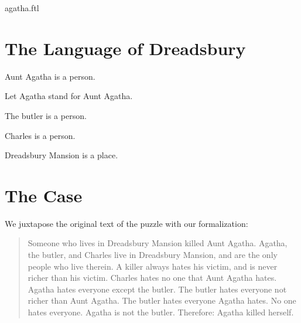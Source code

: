 \documentclass{article}
\begin{document}
\begin{smodule}{agatha.ftl}
  \section{The Language of Dreadsbury}


  \begin{forthel}
    \begin{signature}
      Aunt Agatha is a person.
    \end{signature}

    Let Agatha stand for Aunt Agatha.

    \begin{signature}
      The butler is a person.
    \end{signature}

    \begin{signature}
      Charles is a person.
    \end{signature}

    \begin{signature}
      Dreadsbury Mansion is a place.
    \end{signature}
  \end{forthel}


  \section{The Case}

  We juxtapose the original text of the puzzle with our formalization:

  \begin{quotation}
    \noindent Someone who lives in Dreadsbury Mansion killed Aunt Agatha.
    Agatha, the butler, and Charles live in Dreadsbury Mansion, and are the only
    people who live therein.
    A killer always hates his victim, and is never richer than his victim.
    Charles hates no one that Aunt Agatha hates.
    Agatha hates everyone except the butler.
    The butler hates everyone not richer than Aunt Agatha.
    The butler hates everyone Agatha hates.
    No one hates everyone.
    Agatha is not the butler.
    Therefore: Agatha killed herself.
  \end{quotation}



\end{smodule}
\end{document}
